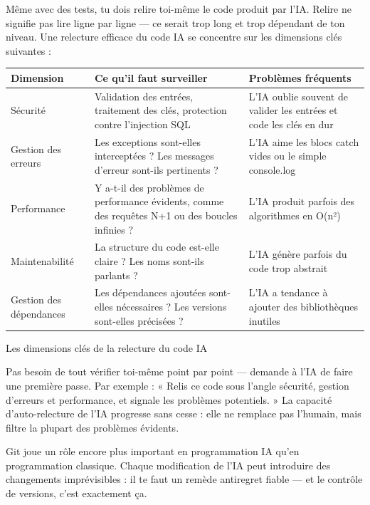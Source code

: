 
Même avec des tests, tu dois relire toi-même le code produit par l'IA. Relire ne signifie pas lire ligne par ligne — ce serait trop long et trop dépendant de ton niveau. Une relecture efficace du code IA se concentre sur les dimensions clés suivantes :

\begin{center}
\begin{tabularx}{\linewidth}{|X|X|X|}
\hline
\textbf{Dimension} & \textbf{Ce qu'il faut surveiller} & \textbf{Problèmes fréquents} \tabularnewline
\hline
Sécurité & Validation des entrées, traitement des clés, protection contre l'injection SQL & L'IA oublie souvent de valider les entrées et code les clés en dur \tabularnewline
Gestion des erreurs & Les exceptions sont-elles interceptées ? Les messages d'erreur sont-ils pertinents ? & L'IA aime les blocs catch vides ou le simple console.log \tabularnewline
Performance & Y a-t-il des problèmes de performance évidents, comme des requêtes N+1 ou des boucles infinies ? & L'IA produit parfois des algorithmes en O(n²) \tabularnewline
Maintenabilité & La structure du code est-elle claire ? Les noms sont-ils parlants ? & L'IA génère parfois du code trop abstrait \tabularnewline
Gestion des dépendances & Les dépendances ajoutées sont-elles nécessaires ? Les versions sont-elles précisées ? & L'IA a tendance à ajouter des bibliothèques inutiles \tabularnewline
\hline
\end{tabularx}
\end{center}

\begin{center}\small\color{gray}Les dimensions clés de la relecture du code IA\end{center}

Pas besoin de tout vérifier toi-même point par point — demande à l'IA de faire une première passe. Par exemple : « Relis ce code sous l'angle sécurité, gestion d'erreurs et performance, et signale les problèmes potentiels. » La capacité d'auto-relecture de l'IA progresse sans cesse : elle ne remplace pas l'humain, mais filtre la plupart des problèmes évidents.


Git joue un rôle encore plus important en programmation IA qu'en programmation classique. Chaque modification de l'IA peut introduire des changements imprévisibles : il te faut un remède antiregret fiable — et le contrôle de versions, c'est exactement ça.

